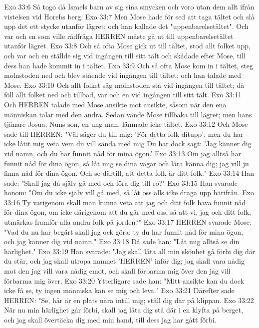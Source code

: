 Exo 33:6  Så togo då Israels barn av sig sina smycken och voro utan dem allt ifrån vistelsen vid Horebs berg.
Exo 33:7  Men Mose hade för sed att taga tältet och slå upp det ett stycke utanför lägret; och han kallade det "uppenbarelsetältet". Och var och en som ville rådfråga HERREN måste gå ut till uppenbarelsetältet utanför lägret.
Exo 33:8  Och så ofta Mose gick ut till tältet, stod allt folket upp, och var och en ställde sig vid ingången till sitt tält och skådade efter Mose, till dess han hade kommit in i tältet.
Exo 33:9  Och så ofta Mose kom in i tältet, steg molnstoden ned och blev stående vid ingången till tältet; och han talade med Mose.
Exo 33:10  Och allt folket såg molnstoden stå vid ingången till tältet; då föll allt folket ned och tillbad, var och en vid ingången till sitt tält.
Exo 33:11  Och HERREN talade med Mose ansikte mot ansikte, såsom när den ena människan talar med den andra. Sedan vände Mose tillbaka till lägret; men hans tjänare Josua, Nuns son, en ung man, lämnade icke tältet.
Exo 33:12  Och Mose sade till HERREN: "Väl säger du till mig: 'För detta folk ditupp'; men du har icke låtit mig veta vem du vill sända med mig Du har dock sagt: 'Jag känner dig vid namn, och du har funnit nåd för mina ögon.'
Exo 33:13  Om jag alltså har funnit nåd för dina ögon, så låt mig se dina vägar och lära känna dig; jag vill ju finna nåd för dina ögon. Och se därtill, att detta folk är ditt folk."
Exo 33:14  Han sade: "Skall jag då själv gå med och föra dig till ro?"
Exo 33:15  Han svarade honom: "Om du icke själv vill gå med, så låt oss alls icke draga upp härifrån.
Exo 33:16  Ty varigenom skall man kunna veta att jag och ditt folk hava funnit nåd för dina ögon, om icke därigenom att du går med oss, så att vi, jag och ditt folk, utmärkas framför alla andra folk på jorden?"
Exo 33:17  HERREN svarade Mose: "Vad du nu har begärt skall jag ock göra; ty du har funnit nåd för mina ögon, och jag känner dig vid namn."
Exo 33:18  Då sade han: "Låt mig alltså se din härlighet."
Exo 33:19  Han svarade: "Jag skall låta all min skönhet gå förbi dig där du står, och jag skall utropa namnet 'HERREN' inför dig; jag skall vara nådig mot den jag vill vara nådig emot, och skall förbarma mig över den jag vill förbarma mig över.
Exo 33:20  Ytterligare sade han: "Mitt ansikte kan du dock icke få se, ty ingen människa kan se mig och leva."
Exo 33:21  Därefter sade HERREN: "Se, här är en plats nära intill mig; ställ dig där på klippan.
Exo 33:22  När nu min härlighet går förbi, skall jag låta dig stå där i en klyfta på berget, och jag skall övertäcka dig med min hand, till dess jag har gått förbi.
